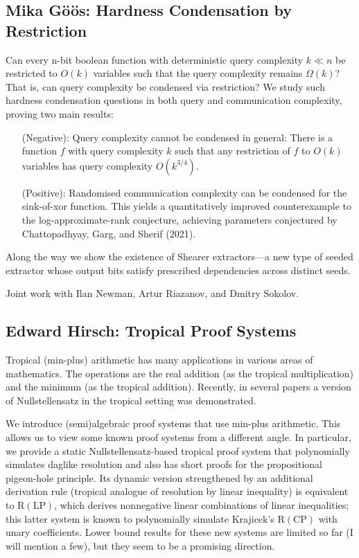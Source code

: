 \documentclass[11pt]{article}
\begin{document}
\subsection*{Mika G\"{o}\"{o}s: Hardness Condensation by Restriction}\label{Goos}
Can every n-bit boolean function with deterministic query complexity $k \ll n$ be restricted to $O(k)$ variables such that the query complexity remains $\Omega(k)$? That is, can query complexity be condensed via restriction? We study such hardness condensation questions in both query and communication complexity, proving two main results:
\begin{itemize}
\item[(Negative):] Query complexity cannot be condensed in general: There is a function $f$ with query complexity $k$ such that any restriction of $f$ to $O(k)$ variables has query complexity $O(k^{3/4})$.

\item[(Positive):] Randomised communication complexity can be condensed for the sink-of-xor function. This yields a quantitatively improved counterexample to the log-approximate-rank conjecture, achieving parameters conjectured by Chattopadhyay, Garg, and Sherif (2021).
\end{itemize}
Along the way we show the existence of Shearer extractors---a new type of seeded extractor whose output bits satisfy prescribed dependencies across distinct seeds.

Joint work with Ilan Newman, Artur Riazanov, and Dmitry Sokolov.



\subsection*{Edward Hirsch: Tropical Proof Systems}\label{Hirsch}

Tropical (min-plus) arithmetic has many applications in various areas of mathematics. The operations are the real addition (as the tropical multiplication) and the minimum (as the tropical addition). Recently, in several papers a version of Nullstellensatz in the tropical setting was demonstrated. 

We introduce (semi)algebraic proof systems that use min-plus arithmetic. This allows us to view some known proof systems from a different angle. In particular, we provide a static Nullstellensatz-based tropical proof system that polynomially simulates daglike resolution and also has short proofs for the propositional pigeon-hole principle. Its dynamic version strengthened by an additional derivation rule (tropical analogue of resolution by linear inequality) is equivalent to $\mathrm{R}(\mathrm{LP})$, which derives nonnegative linear combinations of linear inequalities; this latter system is known to polynomially simulate Krajicek's $\mathrm{R}(\mathrm{CP})$ with unary coefficients. Lower bound results for these new systems are limited so far (I will mention a few), but they seem to be a promising direction.
\end{document}
